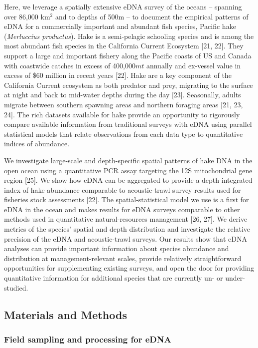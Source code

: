 \documentclass[
]{article}
\begin{document}
Here, we leverage a spatially extensive eDNA survey of the oceans -- 
spanning over 86,000 km\(^2\) and to depths of 500m -- 
to document the empirical patterns of eDNA for a
commercially important and abundant fish species, Pacific hake
(\emph{Merluccius productus}). Hake is a semi-pelagic schooling species
and is among the most abundant fish species in the California Current
Ecosystem {[}21, 22{]}. They support a large and important fishery along the
Pacific coasts of US and Canada with coastwide catches in excess of
400,000\(mt\) annually and ex-vessel value in excess of \$60 million in recent years {[}22{]}.
Hake are a key component of the California Current ecosystem as both predator and prey, migrating
to the surface at night and back to mid-water depths during the day {[}23{]}.  Seasonally,
adults migrate between southern
spawning areas and northern foraging areas {[}21, 23, 24{]}. The rich 
datasets available for hake provide an opportunity to rigorously compare 
available information from traditional surveys with eDNA using parallel
statistical models that relate observations from each data type to
quantitative indices of abundance.

We investigate large-scale and depth-specific spatial patterns of hake
DNA in the open ocean using a quantitative PCR assay targeting the 12S
mitochondrial gene region {[}25{]}. We show how eDNA can be aggregated to
provide a depth-integrated index of hake abundance comparable to
acoustic-trawl survey results used for fisheries stock assessments {[}22{]}.
The spatial-statistical model we use is a first for eDNA in the ocean
and makes results for eDNA surveys comparable to other methods used in
quantitative natural-resources management {[}26, 27{]}.  
We derive metrics of the species' spatial and depth distribution and
investigate the relative precision of the eDNA and acoustic-trawl surveys.
Our results show that eDNA analyses can provide important information 
about species abundance and distribution at management-relevant scales, provide relatively straightforward
opportunities for supplementing existing surveys, and open the door for
providing quantitative information for additional species that are
currently un- or under-studied. 

\hypertarget{methods}{%
\subsection{Materials and Methods}\label{methods}}

\hypertarget{field-sampling-and-processing-for-edna}{%
\subsubsection{Field sampling and processing for
eDNA}\label{field-sampling-and-processing-for-edna}}
\end{document}
